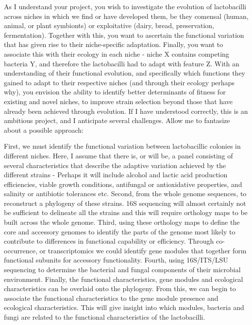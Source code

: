 \documentclass[letterpaper, 10pt]{article} %
\begin{document}
\begin{tcolorbox}[
	blanker,
	width=0.90\textwidth,
	enlarge left by=0.05\textwidth,
	enlarge right by=0.05\textwidth,
	before skip=6pt,
	breakable]
As I understand your project, you wish to investigate the evolution of lactobacilli across niches in which we find or have developed them, be they comensal (human, animal, or plant symbionts) or exploitative (dairy, bread, preservation, fermentation). Together with this, you want to ascertain the functional variation that has given rise to their niche-specific adaptation. Finally, you want to associate this with their ecology in each niche - niche X contains competing bacteria Y, and therefore the lactobacilli had to adapt with feature Z. With an understanding of their functional evolution, and specifically which functions they gained to adapt to their respective niches (and through their ecology perhaps why), you envision the ability to identify better determinants of fitness for existing and novel niches, to improve strain selection beyond those that have already been achieved through evolution. If I have understood correctly, this is an ambitious project, and I anticipate several challenges. Allow me to fantasize about a possible approach:

First, we must identify the functional variation between lactobacillic colonies in different niches. Here, I assume that there is, or will be, a panel consisting of several characteristics that describe the adaptive variation achieved by the different strains - Perhaps it will include alcohol and lactic acid production efficiencies, viable growth conditions, antifungal or antioxidative properties, and salinity or antibiotic tolerances etc. Second, from the whole genome sequences, to reconstruct a phylogeny of these strains. 16S sequencing will almost certainly not be sufficient to delineate all the strains and this will require orthology maps to be built across the whole genome. Third, using these orthology maps to define the core and accessory genomes to identify the parts of the genome most likely to contribute to differences in functional capability or efficiency. Through co-occurrence, or transcriptomics we could identify gene modules that together form functional subunits for accessory functionality. Fourth, using 16S/ITS/LSU sequencing to determine the bacterial and fungal components of their microbial environment. Finally, the functional characteristics, gene modules and ecological characteristics can be overlaid onto the phylogeny. From this, we can begin to associate the functional characteristics to the gene module presence and ecological characteristics. This will give insight into which modules, bacteria and fungi are related to the functional characteristics of the lactobacilli.


\end{tcolorbox}
\end{document}

